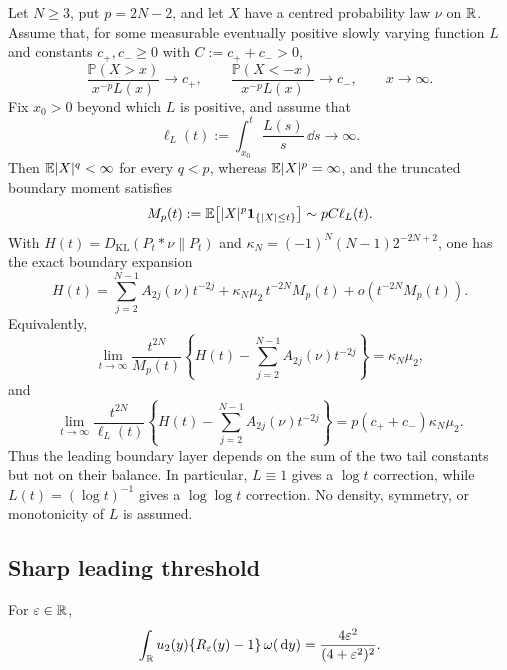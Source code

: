 \begin{theorem}%
\label{cor:main-body-conditional-missing-top-moment-tail}
Let \(N\ge3\), put \(p=2N-2\), and let \(X\) have a centred probability
law \(\nu\) on \(\mathbb{R}\).  Assume that, for some measurable eventually
positive slowly varying function \(L\) and constants \(c_+,c_-\ge0\) with
\(C:=c_++c_->0\),
\[
 \frac{\mathbb P(X>x)}{x^{-p}L(x)}\longrightarrow c_+,\qquad
 \frac{\mathbb P(X<-x)}{x^{-p}L(x)}\longrightarrow c_-,
 \qquad x\to\infty.
\]
Fix \(x_0>0\) beyond which \(L\) is positive, and assume that
\[
 \ell_L(t):=\int_{x_0}^{t}\frac{L(s)}s\,\dd s\longrightarrow\infty.
\]
Then \(\mathbb{E}|X|^q<\infty\) for every \(q<p\), whereas
\(\mathbb{E}|X|^p=\infty\), and the truncated boundary moment satisfies
\[
 M_p(t):=\mathbb{E}\!\left[|X|^p\mathbf1_{\{|X|\le t\}}\right]
 \sim pC\ell_L(t).
\]
With \(H(t)=D_{\mathrm{KL}}(P_t*\nu\|P_t)\) and
\(\kappa_N=(-1)^N(N-1)2^{-2N+2}\), one has the exact boundary expansion
\[
H(t)=
\sum_{j=2}^{N-1}A_{2j}(\nu)t^{-2j}
+\kappa_N\mu_2\,t^{-2N}M_p(t)
+o(t^{-2N}M_p(t)).
\]
Equivalently,
\[
 \lim_{t\to\infty}\frac{t^{2N}}{M_p(t)}
 \left\{H(t)-\sum_{j=2}^{N-1}A_{2j}(\nu)t^{-2j}\right\}
 =\kappa_N\mu_2,
\]
and
\[
 \lim_{t\to\infty}\frac{t^{2N}}{\ell_L(t)}
 \left\{H(t)-\sum_{j=2}^{N-1}A_{2j}(\nu)t^{-2j}\right\}
 =p(c_++c_-)\kappa_N\mu_2.
\]
Thus the leading boundary layer depends on the sum of the two tail constants
but not on their balance.  In particular, \(L\equiv1\) gives a \(\log t\)
correction, while \(L(t)=(\log t)^{-1}\) gives a \(\log\log t\)
correction.  No density, symmetry, or monotonicity of \(L\) is assumed.
\end{theorem}

\subsection{Sharp leading threshold}

\begin{lemma}%
\label{lem:second-mode-cauchy-translate-transform}
For \(\varepsilon\in\mathbb{R}\),
\[
\int_{\mathbb{R}}u_2(y)\{R_\varepsilon(y)-1\}\,\omega(\,\mathrm{d} y)
=\frac{4\varepsilon^2}{(4+\varepsilon^2)^2}.
\]
\end{lemma}

